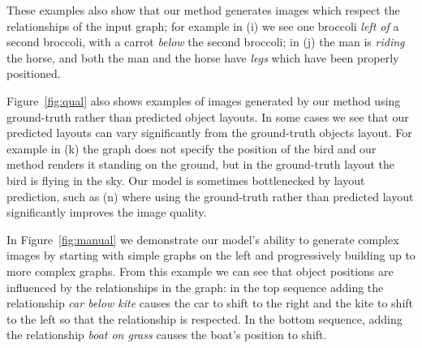 \documentclass[10pt,twocolumn,letterpaper]{article}
\begin{document}
These examples also show that our method generates images which respect the
relationships of the input graph; for example in (i) we see one broccoli 
\emph{left of} a second broccoli, with a carrot \emph{below} the second broccoli; 
in (j) the man is \emph{riding} the horse, and both the man and the horse have
\emph{legs} which have been properly positioned.

Figure~\ref{fig:qual} also shows examples of images generated by our method
using ground-truth rather than predicted object layouts. In some cases we see
that our predicted layouts can vary significantly from the ground-truth objects
layout. For example in (k) the graph does not specify the position of the bird
and our method renders it standing on the ground, but in the ground-truth layout 
the bird is flying in the sky. Our model is sometimes bottlenecked by layout
prediction, such as (n) where using the ground-truth rather than predicted
layout significantly improves the image quality.

In Figure~\ref{fig:manual} we demonstrate our model's ability to generate complex
images by starting with simple graphs on the left and progressively building up
to more complex graphs. From this example we can see that object positions are
influenced by the relationships in the graph: in the top sequence
adding the relationship \emph{car below kite} causes the car to shift to the
right and the kite to shift to the left so that the relationship is respected.
In the bottom sequence, adding the relationship \emph{boat on grass} causes the
boat's position to shift.
\end{document}
